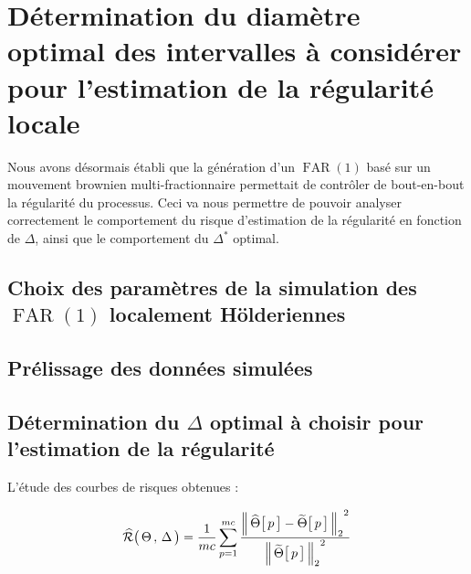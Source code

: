 \chapter{Détermination du diamètre optimal des intervalles à considérer pour l'estimation de la régularité locale }
\minitoc%


Nous avons désormais établi que la génération d'un $\operatorname{FAR}(1)$ basé sur un mouvement brownien multi-fractionnaire permettait de contrôler de bout-en-bout la régularité du processus. Ceci va nous permettre de pouvoir analyser correctement le comportement du risque d'estimation de la régularité en fonction de $\Delta$, ainsi que le comportement du $\Delta^*$ optimal.

\section{Choix des paramètres de la simulation des $\operatorname{FAR}(1)$ localement Hölderiennes}



\section{Prélissage des données simulées}




% 
% 
% 
\section{Détermination du $\Delta$ optimal à choisir pour l'estimation de la régularité}

\noindent L'étude des courbes de risques obtenues :

\begin{equation*}
\widehat{\mathcal R} \bigl( \, \Theta \, , \, \Delta \, \bigr) 
= 
\frac 1 {mc} \sum\limits_{p=1}^{mc} \frac{{\distnorme 2 {\widehat \Theta\bigl[\, p \,\bigr]} {\widetilde \Theta \bigl[ \,p \,\bigr]}}^2}{{\norme 2 {\widetilde \Theta \bigl[ \,p \,\bigr]}}^2}
\end{equation*}

